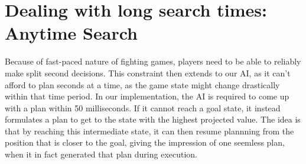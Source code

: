 







\section{Dealing with long search times: Anytime Search}
Because of fast-paced nature of fighting games, players need to be able to reliably make split second decisions. This constraint then extends to our AI, as it can't afford to plan seconds at a time, as the game state might change drastically within that time period. In our implementation, the AI is required to come up with a plan within 50 milliseconds. If it cannot reach a goal state, it instead formulates a plan to get to the state with the highest projected value. The idea is that by reaching this intermediate state, it can then resume plannning from the position that is closer to the goal, giving the impression of one seemless plan, when it in fact generated that plan during execution.

